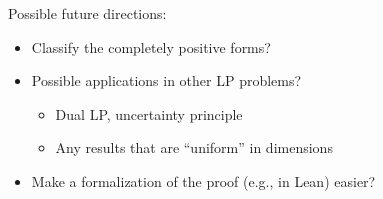 \documentclass[reqno]{amsart} 
\begin{document}
Possible future directions:
\begin{itemize}
\item Classify the completely positive forms?
\item Possible applications in other LP problems?
  \begin{itemize}
  \item Dual LP, uncertainty principle
  \item Any results that are ``uniform'' in dimensions
  \end{itemize}
\item Make a formalization of the proof (e.g., in Lean) easier?
\end{itemize}



{} 
\end{document}
